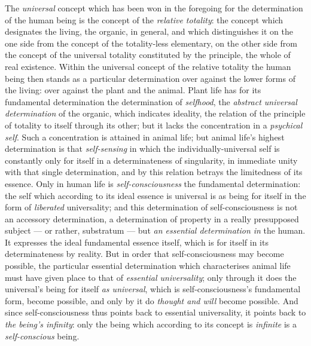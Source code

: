 \documentclass[12pt,a4paper]{book}
\begin{document}
The \emph{universal} concept which has been won in the foregoing for the
determination of the human being is the concept of the \emph{relative
totality}: the concept which designates the living, the organic, in general,
and which distinguishes it on the one side from the concept of the
totality-less elementary, on the other side from the concept of the universal
totality constituted by the principle, the whole of real existence. Within the
universal concept of the relative totality the human being then stands as a
particular determination over against the lower forms of the living: over
against the plant and the animal. Plant life has for its fundamental
determination the determination of \emph{selfhood}, the \emph{abstract
universal determination} of the organic, which indicates ideality, the relation
of the principle of totality to itself through its other; but it lacks the
concentration in a \emph{psychical self}. Such a concentration is attained in
animal life; but animal life's highest determination is that
\emph{self-sensing} in which the individually-universal self is constantly
only for itself in a determinateness of singularity, in immediate unity with
that single determination, and by this relation betrays the limitedness of its
essence. Only in human life is \emph{self-consciousness} the fundamental
determination: the self which according to its ideal essence is universal is
as being for itself in the form of \emph{liberated} universality; and this
determination of self-consciousness is not an accessory determination, a
determination of property in a really presupposed subject --- or rather,
substratum --- but \emph{an essential determination in} the human. It
expresses the ideal fundamental essence itself, which
is for itself in its determinateness by reality. But in order that
self-consciousness may become possible, the particular essential determination
which characterises animal life must have given place to that of \emph{essential
universality}; only through it does the universal's being for itself \emph{as
universal}, which is self-consciousness's fundamental form, become possible,
and only by it do \emph{thought and will} become possible. And since
self-consciousness thus points back to essential universality, it points back
to \emph{the being's infinity}: only the being which according to its concept
is \emph{infinite} is a \emph{self-conscious} being.
\end{document}
